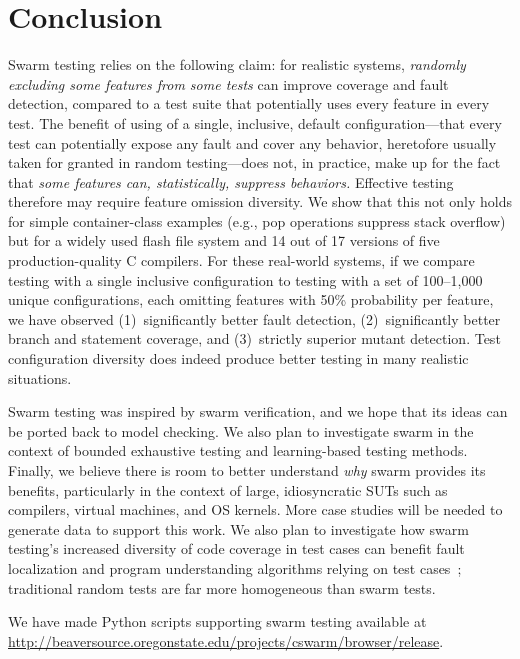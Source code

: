 

\section{Conclusion}

Swarm testing relies on the following claim: for realistic systems,
\emph{randomly excluding some features from some tests} can improve
coverage and fault detection, compared to a test suite that
potentially uses every feature in every test.
%
The benefit of using of a single, inclusive, default
configuration---that every test can potentially expose any fault and
cover any behavior, heretofore usually taken for granted in random
testing---does not, in practice, make up for the fact that \emph{some
features can, statistically, suppress behaviors.}  Effective testing
therefore may require feature omission diversity.
%
We show that this not only holds for simple container-class examples
(e.g., pop operations suppress stack overflow) but for a widely used
flash file system and 14 out of 17 versions of five production-quality C
compilers.
%
For these real-world systems, if we compare testing with a single
inclusive configuration to testing with a set of 100--1,000
unique configurations, each omitting features with 50\% probability
per feature, we have observed (1)~significantly better fault
detection, (2)~significantly better branch and statement coverage, and
(3)~strictly superior mutant detection.  
%
Test configuration diversity does indeed produce better testing in
many realistic situations.


Swarm testing was inspired by swarm verification, and we hope that its
ideas can be ported back to model checking.
%
We also plan to investigate swarm in the context of bounded exhaustive
testing and learning-based testing methods.
%
Finally, we believe there is room to better understand \emph{why}
swarm provides its benefits, particularly in the context
of large, idiosyncratic SUTs such as compilers, virtual machines, and
OS kernels.
%
More case studies will be needed to generate data to support this
work.  We also plan to investigate how swarm testing's increased
diversity of code coverage in test cases can benefit fault
localization and program understanding algorithms
relying on test cases~\cite{Tarantula}; traditional random tests are far more
homogeneous than swarm tests.


We have made Python scripts supporting swarm testing available at
\url{http://beaversource.oregonstate.edu/projects/cswarm/browser/release}.
%
%


